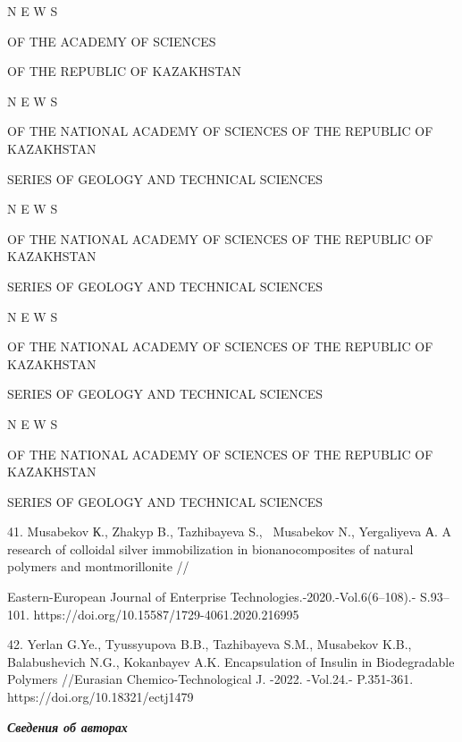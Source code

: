 \begin{noparindent}
N E W S

OF THE ACADEMY OF SCIENCES

OF THE REPUBLIC OF KAZAKHSTAN

N E W S

OF THE NATIONAL ACADEMY OF SCIENCES OF THE REPUBLIC OF KAZAKHSTAN

SERIES OF GEOLOGY AND TECHNICAL SCIENCES

N E W S

OF THE NATIONAL ACADEMY OF SCIENCES OF THE REPUBLIC OF KAZAKHSTAN

SERIES OF GEOLOGY AND TECHNICAL SCIENCES

N E W S

OF THE NATIONAL ACADEMY OF SCIENCES OF THE REPUBLIC OF KAZAKHSTAN

SERIES OF GEOLOGY AND TECHNICAL SCIENCES

N E W S

OF THE NATIONAL ACADEMY OF SCIENCES OF THE REPUBLIC OF KAZAKHSTAN

SERIES OF GEOLOGY AND TECHNICAL SCIENCES

41. Musabekov К., Zhakyp B., Tazhibayeva S., ~Musabekov N., Yergaliyeva
А. A research of colloidal silver immobilization in bionanocomposites of
natural polymers and montmorillonite //

Eastern-European Journal of Enterprise
Technologies.-2020.-Vol.6(6--108).- S.93--101.
https://doi.org/10.15587/1729-4061.2020.216995

42. Yerlan G.Ye., Tyussyupova B.B., Tazhibayeva S.M., Musabekov K.B.,
Balabushevich N.G., Kokanbayev A.K. Encapsulation of Insulin in
Biodegradable Polymers //Eurasian Chemico-Technological J. -2022.
-Vol.24.- P.351-361. https://doi.org/10.18321/ectj1479
\end{noparindent}

\emph{{\bfseries Сведения об авторах}}

